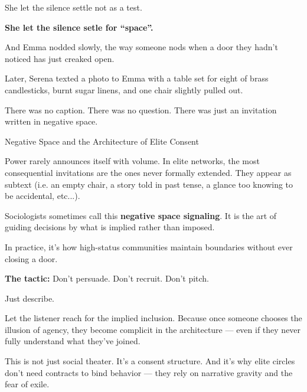 She let the silence settle not as a test. 

\textbf{She let the silence setle for ``space''.} 

And Emma nodded slowly, the way someone nods when a door they hadn’t noticed has just creaked open.

Later, Serena texted a photo to Emma with a table set for eight of 
brass candlesticks, burnt sugar linens, and one chair slightly pulled out.

There was no caption.  
There was no question.  
There was just an invitation written in negative space.

\medskip

\begin{PsychologicalSidebar}{Negative Space and the Architecture of Elite Consent}

Power rarely announces itself with volume.  
In elite networks, the most consequential invitations are the ones never formally extended.  
They appear as subtext (i.e. an empty chair, a story told in past tense, a glance too knowing 
to be accidental, etc...).

\medskip

Sociologists sometimes call this \textbf{negative space signaling}. It is the art of guiding 
decisions by what is implied rather than imposed.  

\medskip

In practice, it's how high-status communities maintain boundaries without ever closing a door.  

\medskip

\textbf{The tactic:}  Don’t persuade. Don’t recruit. Don’t pitch.

\medskip

Just describe.

\medskip

Let the listener reach for the implied inclusion.  
Because once someone chooses the illusion of agency, they become complicit in the architecture — even if 
they never fully understand what they’ve joined.

\medskip

This is not just social theater.  
It’s a consent structure.  
And it’s why elite circles don’t need contracts to bind behavior — they rely on narrative gravity and the fear of exile.

\end{PsychologicalSidebar}

\medskip

